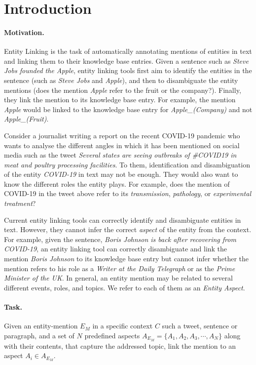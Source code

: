 \documentclass[sigconf,authordraft]{acmart}
\begin{document}
\section{Introduction}
\label{sec:Introduction}

\paragraph{\textbf{Motivation.}} 
Entity Linking is the task of automatically annotating mentions of entities in text and linking them to their knowledge base entries. Given a sentence such as \textit{Steve Jobs founded the Apple}, entity linking tools first aim to identify the entities in the sentence (such as \textit{Steve Jobs} and \textit{Apple}), and then to disambiguate the entity mentions (does the mention \textit{Apple} refer to the fruit or the company?). Finally, they link the mention to its knowledge base entry. For example, the mention \textit{Apple} would be linked to the knowledge base entry for \textit{Apple\_(Company)} and not \textit{Apple\_(Fruit)}.

Consider a journalist  writing a report on the recent COVID-19 pandemic who wants to analyse the different angles in which it has been mentioned on social media such as the tweet \textit{Several states are seeing outbreaks of \#COVID19 in meat and poultry processing facilities}. To them, identification and disambiguation of the entity \textit{COVID-19} in text may not be enough. They would also want to know the different roles the entity plays. For example, does the mention of COVID-19 in the tweet above refer to its \textit{transmission}, \textit{pathology}, or \textit{experimental treatment}? 

Current entity linking tools \cite{ferragina2010tagme,mendes2011dbpedia,piccinno2014wat} can correctly identify and disambiguate entities in text. However, they cannot infer the correct \textit{aspect} of the entity from the context. For example, given the sentence, \textit{Boris Johnson is back after recovering from COVID-19}, an entity linking tool can correctly disambiguate and link the mention \textit{Boris Johnson} to its knowledge base entry but cannot infer whether the mention refers to his role as a \textit{Writer at the Daily Telegraph} or as the \textit{Prime Minister of the UK}. In general, an entity mention may be related to several different events, roles, and topics. We refer to each of them as an \textit{Entity Aspect}. 

\paragraph{\textbf{Task.}} Given an entity-mention $E_M$ in a specific context $C$ such a tweet, sentence or paragraph, and a set of $N$ predefined aspects $A_{E_M} = \{A_1, A_2, A_3, \cdots, A_N\}$ along with their contents, that capture the addressed topic, link the mention to an aspect $A_i \in A_{E_M}$.
\end{document}
